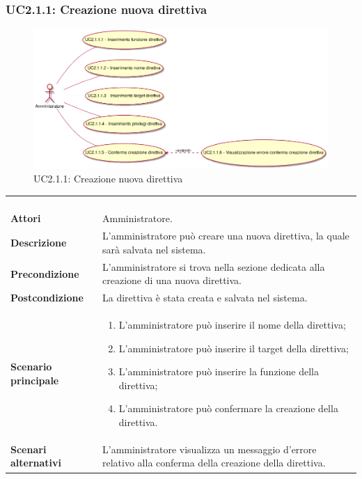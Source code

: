\newpage
\subsubsection{UC2.1.1: Creazione nuova direttiva}
\label{UC2.1.1}
\begin{figure}[h]
\centering
\includegraphics[width=\textwidth,height=\textheight,keepaspectratio]{images/UseCaseUC211.png}
\caption{UC2.1.1: Creazione nuova direttiva}
\end{figure}
\begin{longtable}{l|p{10cm}}
\rowcolor[gray]{0.8} \multicolumn{2}{c}{} \\
\rowcolor[gray]{0.8} \multicolumn{2}{c}{\textbf{UC2.1.1 - Creazione nuova direttiva}} \\
\rowcolor[gray]{0.8} \multicolumn{2}{c}{} \\
\hline
&\\
\textbf{Attori} & Amministratore.\\[7pt]
\textbf{Descrizione} & L'amministratore può creare una nuova direttiva, la quale sarà salvata nel sistema.\\[7pt]
\textbf{Precondizione} & L'amministratore si trova nella sezione dedicata alla creazione di una nuova direttiva.\\[7pt]
\textbf{Postcondizione} & La direttiva è stata creata e salvata nel sistema.\\[7pt]
\textbf{Scenario principale} &\begin{enumerate}
\item  L'amministratore può inserire il nome della direttiva;
\item  L'amministratore può inserire il target della direttiva;
\item  L'amministratore può inserire la funzione della direttiva;
\item  L'amministratore può confermare la creazione della direttiva. 
\end{enumerate}
\\[7pt]
\textbf{Scenari alternativi} & L'amministratore visualizza un messaggio d'errore relativo alla conferma della creazione della direttiva.\\[7pt]\hline
\end{longtable}

